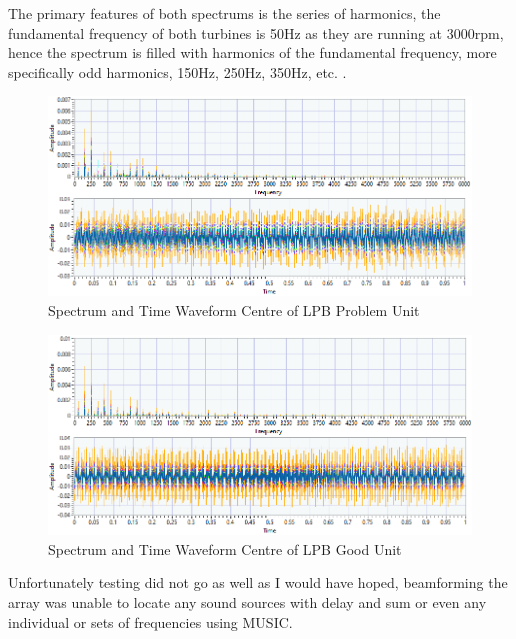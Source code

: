 \documentclass{UoNMCHA}
\numberwithin{equation}{section}
\begin{document}
    The primary features of both spectrums is the series of harmonics, the fundamental frequency of both turbines is 50Hz as they are running at 3000rpm, hence the spectrum is filled with harmonics of the fundamental frequency, more specifically odd harmonics, 150Hz, 250Hz, 350Hz, etc. . 

    \begin{figure} [H]
        \centering
        \includegraphics[keepaspectratio, width = \textwidth]{Figures/U5_LPB.png}
        \caption{Spectrum and Time Waveform Centre of LPB Problem Unit}
        \label{fig:U5 Signal}
    \end{figure}

    \begin{figure} [H]
        \centering
        \includegraphics[keepaspectratio, width = \textwidth]{Figures/U6_LPB.png}
        \caption{Spectrum and Time Waveform Centre of LPB Good Unit}
        \label{fig:U6 Signal}
    \end{figure}

    Unfortunately testing did not go as well as I would have hoped, beamforming the array was unable to locate any sound sources with delay and sum or even any individual or sets of frequencies using MUSIC.
\end{document}

